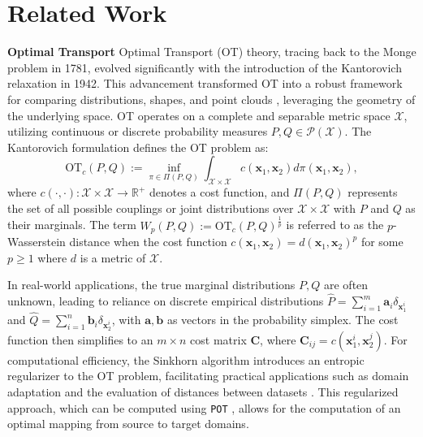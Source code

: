 \documentclass[11pt,a4paper]{article}
\begin{document}
\section{Related Work}

\textbf{Optimal Transport} Optimal Transport (OT) theory, tracing back to the Monge problem in 1781, evolved significantly with the introduction of the Kantorovich relaxation \cite{kantorovich1942translocation} in 1942. 
This advancement transformed OT into a robust framework for comparing distributions, shapes, and point clouds \cite{peyre2019computational}, leveraging the geometry of the underlying space. 
OT operates on a complete and separable metric space $\mathcal{X}$, utilizing continuous or discrete probability measures $P, Q \in \mathcal{P(X)}$. 
The Kantorovich formulation defines the OT problem as:
\begin{equation}
\mathrm{OT}_c(P, Q) := \mathop{\inf}\limits_{\pi \in \Pi(P, Q)} \int_{\mathcal{X} \times \mathcal{X}} c(\mathbf{x}_1, \mathbf{x}_2)d\pi (\mathbf{x}_1, \mathbf{x}_2),
\end{equation}
where $c(\cdot,\cdot): \mathcal{X}\times\mathcal{X} \rightarrow \mathbb{R^+}$ denotes a cost function, and $\Pi(P, Q)$ represents the set of all possible couplings or joint distributions over $\mathcal{X}\times\mathcal{X}$ with $P$ and $Q$ as their marginals. 
The term $W_p(P,Q) := \mathrm{OT}_c(P, Q)^{\frac{1}{p} }$ is referred to as the $p$-Wasserstein distance when the cost function $c(\mathbf{x}_1, \mathbf{x}_2)=d(\mathbf{x}_1, \mathbf{x}_2)^p$ for some $p\geq1$ where $d$ is a metric of $\mathcal{X}$.

In real-world applications, the true marginal distributions $P, Q$ are often unknown, leading to reliance on discrete empirical distributions $\hat{P}=\sum_{i=1}^{m}\mathbf{a}_i\delta_{\mathbf{x}_1^i}$ and $\hat{Q}=\sum_{i=1}^{n}\mathbf{b}_i\delta_{\mathbf{x}_2^i}$, with $\mathbf{a},\mathbf{b}$ as vectors in the probability simplex. 
The cost function then simplifies to an $m \times n$ cost matrix $\mathbf{C}$, where $\mathbf{C}_{ij} = c(\mathbf{x}_1^i, \mathbf{x}_2^j)$. 
For computational efficiency, the Sinkhorn algorithm \cite{cuturi2013sinkhorn} introduces an entropic regularizer to the OT problem, facilitating practical applications such as domain adaptation \cite{courty2016optimal} and the evaluation of distances between datasets \cite{alvarez2020geometric}. 
This regularized approach, which can be computed using \verb|POT| \cite{flamary2021pot}, allows for the computation of an optimal mapping from source to target domains.
\end{document}
